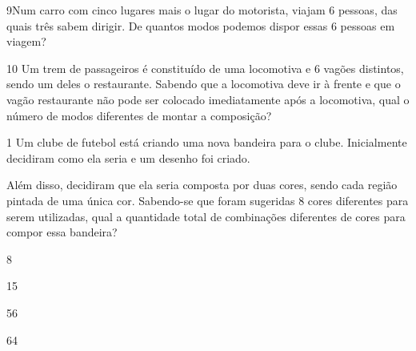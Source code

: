 {


\num{9}Num carro com cinco lugares mais o lugar do motorista, viajam 6
pessoas, das quais três sabem dirigir. De quantos modos podemos dispor
essas 6 pessoas em viagem?



\num{10} Um trem de passageiros é constituído de uma locomotiva e 6 vagões
distintos, sendo um deles o restaurante. Sabendo que a locomotiva deve ir
à frente e que o vagão restaurante não pode ser colocado imediatamente
após a locomotiva, qual o número de modos diferentes de montar a composição?




\num{1} Um clube de futebol está criando uma nova bandeira para o clube.
Inicialmente decidiram como ela seria e um desenho foi criado.


Além disso, decidiram que ela seria composta por duas cores, sendo cada
região pintada de uma única cor. Sabendo-se que foram sugeridas 8 cores
diferentes para serem utilizadas, qual a quantidade total de combinações
diferentes de cores para compor essa bandeira?

\begin{escolha}
\item
  8
\item
  15
\item
  56
\item
  64
\end{escolha}

}
